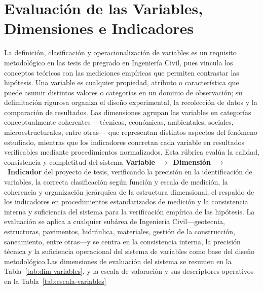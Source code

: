 \clearpage
\section{Evaluación de las Variables, Dimensiones e Indicadores}

{\footnotesize\setlength{\baselineskip}{0.85\baselineskip}
La definición, clasificación y operacionalización de variables es un requisito metodológico en las tesis de pregrado en Ingeniería Civil, pues vincula los conceptos teóricos con las mediciones empíricas que permiten contrastar las hipótesis. Una variable es cualquier propiedad, atributo o característica que puede asumir distintos valores o categorías en un dominio de observación; su delimitación rigurosa organiza el diseño experimental, la recolección de datos y la comparación de resultados. Las dimensiones agrupan las variables en categorías conceptualmente coherentes —técnicas, económicas, ambientales, sociales, microestructurales, entre otras— que representan distintos aspectos del fenómeno estudiado, mientras que los indicadores concretan cada variable en resultados verificables mediante procedimientos normalizados. Esta rúbrica evalúa la calidad, consistencia y completitud del sistema \textbf{Variable}~$\rightarrow$~\textbf{Dimensión}~$\rightarrow$~\textbf{Indicador} del proyecto de tesis, verificando la precisión en la identificación de variables, la correcta clasificación según función y escala de medición, la coherencia y organización jerárquica de la estructura dimensional, el respaldo de los indicadores en procedimientos estandarizados de medición y la consistencia interna y suficiencia del sistema para la verificación empírica de las hipótesis. La evaluación se aplica a cualquier subárea de Ingeniería Civil—geotecnia, estructuras, pavimentos, hidráulica, materiales, gestión de la construcción, saneamiento, entre otras—y se centra en la consistencia interna, la precisión técnica y la suficiencia operacional del sistema de variables como base del diseño metodológico.Las dimensiones de evaluación del sistema se resumen en la Tabla~\ref{tab:dim-variables}, y la escala de valoración y sus descriptores operativos en la Tabla~\ref{tab:escala-variables}\par}
\vspace{-12pt}
